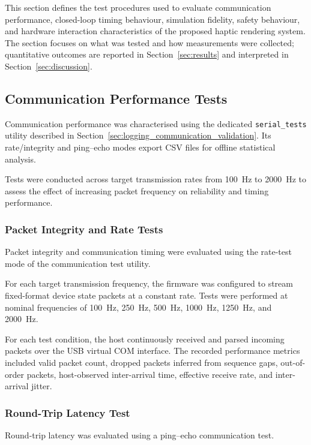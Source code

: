 This section defines the test procedures used to evaluate communication performance, closed-loop timing behaviour, simulation fidelity, safety behaviour, and hardware interaction characteristics of the proposed haptic rendering system.
The section focuses on what was tested and how measurements were collected; quantitative outcomes are reported in Section~\ref{sec:results} and interpreted in Section~\ref{sec:discussion}.

\subsection{Communication Performance Tests}

Communication performance was characterised using the dedicated \texttt{serial\_tests} utility described in Section~\ref{sec:logging_communication_validation}. Its rate/integrity and ping--echo modes export CSV files for offline statistical analysis.

Tests were conducted across target transmission rates from 100~Hz to 2000~Hz to assess the effect of increasing packet frequency on reliability and timing performance.

\subsubsection{Packet Integrity and Rate Tests}

Packet integrity and communication timing were evaluated using the rate-test mode of the communication test utility.

For each target transmission frequency, the firmware was configured to stream fixed-format device state packets at a constant rate. Tests were performed at nominal frequencies of 100~Hz, 250~Hz, 500~Hz, 1000~Hz, 1250~Hz, and 2000~Hz.

For each test condition, the host continuously received and parsed incoming packets over the USB virtual COM interface. The recorded performance metrics included valid packet count, dropped packets inferred from sequence gaps, out-of-order packets, host-observed inter-arrival time, effective receive rate, and inter-arrival jitter.

\subsubsection{Round-Trip Latency Test}

Round-trip latency was evaluated using a ping--echo communication test.

